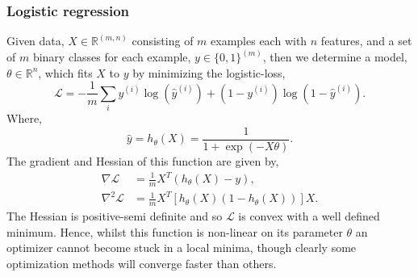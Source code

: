 \documentclass[nohyperref]{article}
\theoremstyle{plain}
\theoremstyle{definition}
\theoremstyle{remark}
\begin{document}
\subsubsection*{Logistic regression}
Given data, $X \in \mathbb{R}^{(m,n)}$ consisting of $m$ examples each with $n$ features, and a set of $m$ binary classes for each example, $y\in \{0,1\}^{(m)}$, then we determine a model, $\theta \in \mathbb{R}^n$, which fits $X$ to $y$ by minimizing the logistic-loss, 
\begin{equation}
\mathcal{L}=-\frac{1}{m}\sum_{i}y^{(i)}\log{(\widehat{y}^{(i)})}+(1-y^{(i)})\log{(1-\widehat{y}^{(i)})}.\label{logistic_func}
\end{equation}
Where,
\begin{equation}
\widehat{y}=h_{\theta}(X)=\frac{1}{1+\exp(-X \theta)}.
\end{equation}
The gradient and Hessian of this function are given by,
\begin{align}
\nabla \mathcal{L}&=\frac{1}{m}X^{T}(h_{\theta}(X)-y),\\
\nabla^2 \mathcal{L}&=\frac{1}{m}X^{T}[h_{\theta}(X)(1-h_{\theta}(X))]X.
\end{align}
The Hessian is positive-semi definite and so $\mathcal{L}$ is convex with a well defined minimum. Hence, whilst this function is non-linear on its parameter $\theta$ an optimizer cannot become stuck in a local minima, though clearly some optimization methods will converge faster than others.
\end{document}
